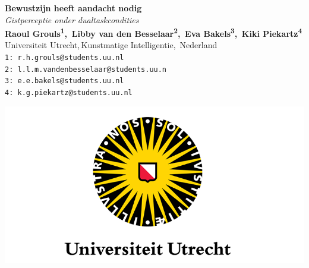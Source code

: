 \documentclass[a1,portrait]{a0poster}
\begin{document}


\begin{minipage}[b]{0.75\linewidth}
\Huge \color{NavyBlue} \textbf{Bewustzijn heeft aandacht nodig} \color{Black}\\ %
\Large\textit{Gistperceptie onder dualtaskcondities}\\[2.4cm] %
\Large \textbf{Raoul Grouls\textsuperscript{1},
	\,Libby van den Besselaar\textsuperscript{2},
	\,Eva Bakels\textsuperscript{3},
	\,Kiki Piekartz\textsuperscript{4}}\\[0.5cm] %
\Large Universiteit Utrecht,\,Kunstmatige Intelligentie,\, Nederland\\[0.4cm] %
\normalsize \texttt{1: r.h.grouls@students.uu.nl}\\
\texttt{2: l.l.m.vandenbesselaar@students.uu.n}\\
\texttt{3: e.e.bakels@students.uu.nl}\\
\texttt{4: k.g.piekartz@students.uu.nl}\\
\end{minipage}
%
\begin{minipage}[b]{0.3\linewidth}
\includegraphics[width=20cm]{uu-logo.png}\\ 
\end{minipage}
\end{document}
